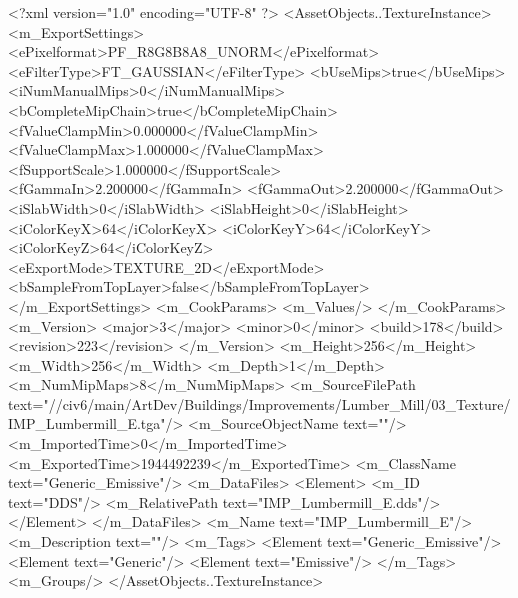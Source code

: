 <?xml version="1.0" encoding="UTF-8" ?>
<AssetObjects..TextureInstance>
	<m_ExportSettings>
		<ePixelformat>PF_R8G8B8A8_UNORM</ePixelformat>
		<eFilterType>FT_GAUSSIAN</eFilterType>
		<bUseMips>true</bUseMips>
		<iNumManualMips>0</iNumManualMips>
		<bCompleteMipChain>true</bCompleteMipChain>
		<fValueClampMin>0.000000</fValueClampMin>
		<fValueClampMax>1.000000</fValueClampMax>
		<fSupportScale>1.000000</fSupportScale>
		<fGammaIn>2.200000</fGammaIn>
		<fGammaOut>2.200000</fGammaOut>
		<iSlabWidth>0</iSlabWidth>
		<iSlabHeight>0</iSlabHeight>
		<iColorKeyX>64</iColorKeyX>
		<iColorKeyY>64</iColorKeyY>
		<iColorKeyZ>64</iColorKeyZ>
		<eExportMode>TEXTURE_2D</eExportMode>
		<bSampleFromTopLayer>false</bSampleFromTopLayer>
	</m_ExportSettings>
	<m_CookParams>
		<m_Values/>
	</m_CookParams>
	<m_Version>
		<major>3</major>
		<minor>0</minor>
		<build>178</build>
		<revision>223</revision>
	</m_Version>
	<m_Height>256</m_Height>
	<m_Width>256</m_Width>
	<m_Depth>1</m_Depth>
	<m_NumMipMaps>8</m_NumMipMaps>
	<m_SourceFilePath text="//civ6/main/ArtDev/Buildings/Improvements/Lumber_Mill/03_Texture/IMP_Lumbermill_E.tga"/>
	<m_SourceObjectName text=""/>
	<m_ImportedTime>0</m_ImportedTime>
	<m_ExportedTime>1944492239</m_ExportedTime>
	<m_ClassName text="Generic_Emissive"/>
	<m_DataFiles>
		<Element>
			<m_ID text="DDS"/>
			<m_RelativePath text="IMP_Lumbermill_E.dds"/>
		</Element>
	</m_DataFiles>
	<m_Name text="IMP_Lumbermill_E"/>
	<m_Description text=""/>
	<m_Tags>
		<Element text="Generic_Emissive"/>
		<Element text="Generic"/>
		<Element text="Emissive"/>
	</m_Tags>
	<m_Groups/>
</AssetObjects..TextureInstance>

